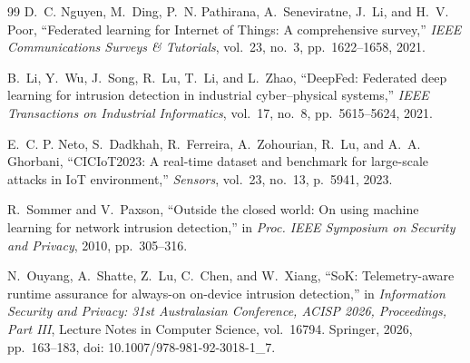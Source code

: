 \documentclass[10pt,journal]{IEEEtran}
\begin{document}
\begin{thebibliography}{99}
D.~C. Nguyen, M.~Ding, P.~N. Pathirana, A.~Seneviratne, J.~Li, and H.~V. Poor, ``Federated learning for Internet of Things: A comprehensive survey,'' \emph{IEEE Communications Surveys \& Tutorials}, vol.~23, no.~3, pp.~1622--1658, 2021.

B.~Li, Y.~Wu, J.~Song, R.~Lu, T.~Li, and L.~Zhao, ``DeepFed: Federated deep learning for intrusion detection in industrial cyber--physical systems,'' \emph{IEEE Transactions on Industrial Informatics}, vol.~17, no.~8, pp.~5615--5624, 2021.

E.~C. P. Neto, S.~Dadkhah, R.~Ferreira, A.~Zohourian, R.~Lu, and A.~A. Ghorbani, ``CICIoT2023: A real-time dataset and benchmark for large-scale attacks in IoT environment,'' \emph{Sensors}, vol.~23, no.~13, p.~5941, 2023.

R.~Sommer and V.~Paxson, ``Outside the closed world: On using machine learning for network intrusion detection,'' in \emph{Proc. IEEE Symposium on Security and Privacy}, 2010, pp.~305--316.

N.~Ouyang, A.~Shatte, Z.~Lu, C.~Chen, and W.~Xiang, ``SoK: Telemetry-aware runtime assurance for always-on on-device intrusion detection,'' in \emph{Information Security and Privacy: 31st Australasian Conference, ACISP 2026, Proceedings, Part III}, Lecture Notes in Computer Science, vol.~16794. Springer, 2026, pp.~163--183, doi: 10.1007/978-981-92-3018-1\_7.

\end{thebibliography}
\end{document}
